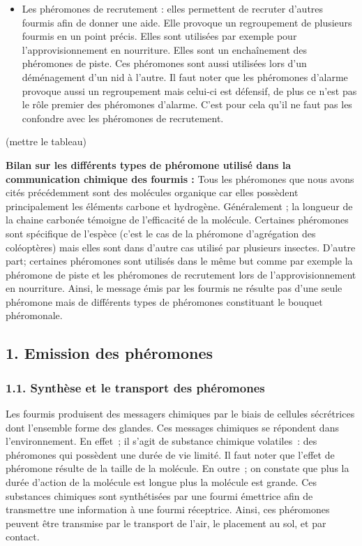 \begin{itemize}
\itemsep1pt\parskip0pt
\item
  Les phéromones de recrutement : elles permettent de recruter d'autres
  fourmis afin de donner une aide. Elle provoque un regroupement de
  plusieurs fourmis en un point précis. Elles sont utilisées par exemple
  pour l'approvisionnement en nourriture. Elles sont un enchaînement des
  phéromones de piste. Ces phéromones sont aussi utilisées lors d'un
  déménagement d'un nid à l'autre. Il faut noter que les phéromones
  d'alarme provoque aussi un regroupement mais celui-ci est défensif, de
  plus ce n'est pas le rôle premier des phéromones d'alarme. C'est pour
  cela qu'il ne faut pas les confondre avec les phéromones de
  recrutement.
\end{itemize}

(mettre le tableau)

\textbf{Bilan sur les différents types de phéromone utilisé dans la
communication chimique des fourmis :} Tous les phéromones que nous avons
cités précédemment sont des molécules organique car elles possèdent
principalement les éléments carbone et hydrogène. Généralement ; la
longueur de la chaine carbonée témoigne de l'efficacité de la molécule.
Certaines phéromones sont spécifique de l'espèce (c'est le cas de la
phéromone d'agrégation des coléoptères) mais elles sont dans d'autre cas
utilisé par plusieurs insectes. D'autre part; certaines phéromones sont
utilisés dans le même but comme par exemple la phéromone de piste et les
phéromones de recrutement lors de l'approvisionnement en nourriture.
Ainsi, le message émis par les fourmis ne résulte pas d'une seule
phéromone mais de différents types de phéromones constituant le bouquet
phéromonale.

\subsection{1. Emission des
phéromones}\label{emission-des-phuxe9romones}

\subsubsection{1.1. Synthèse et le transport des
phéromones}\label{synthuxe8se-et-le-transport-des-phuxe9romones}

Les fourmis produisent des messagers chimiques par le biais de cellules
sécrétrices dont l'ensemble forme des glandes. Ces messages chimiques se
répondent dans l'environnement. En effet~; il s'agit de substance
chimique volatiles~: des phéromones qui possèdent une durée de vie
limité. Il faut noter que l'effet de phéromone résulte de la taille de
la molécule. En outre~; on constate que plus la durée d'action de la
molécule est longue plus la molécule est grande. Ces substances
chimiques sont synthétisées par une fourmi émettrice afin de transmettre
une information à une fourmi réceptrice. Ainsi, ces phéromones peuvent
être transmise par le transport de l'air, le placement au sol, et par
contact.

